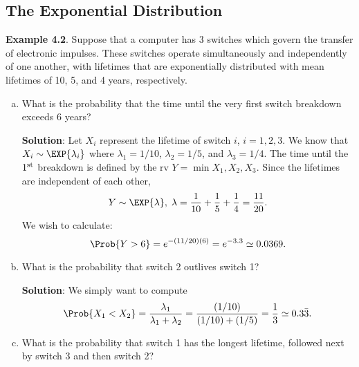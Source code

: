 \subsection*{The Exponential Distribution}
\begin{Example}
    \textbf{Example 4.2}. Suppose that a computer has 3 switches which govern the transfer of electronic
    impulses. These switches operate simultaneously and independently of one another, with
    lifetimes that are exponentially distributed with mean lifetimes of 10, 5, and 4 years,
    respectively.
    \begin{enumerate}[(a)]
        \item What is the probability that the time until the very first switch breakdown exceeds 6
              years?

              \textbf{Solution}: Let $ X_i $ represent the lifetime of switch $ i $, $ i=1,2,3 $.
              We know that $ X_i \sim \EXP{\lambda_i} $ where $ \lambda_1=1/10 $, $ \lambda_2=1/5 $,
              and $ \lambda_3=1/4 $. The time until the $ 1\textsuperscript{st} $ breakdown is defined by
              the rv $ Y=\min{X_1,X_2,X_3} $. Since the lifetimes are independent of each other,
              \[ Y \sim \EXP{\lambda},\; \lambda=\frac{1}{10}+\frac{1}{5}+\frac{1}{4}=\frac{11}{20}. \]
              We wish to calculate:
              \[ \Prob{Y>6}=e^{-(11/20)(6)}=e^{-3.3}\simeq 0.0369. \]
        \item What is the probability that switch 2 outlives switch 1?

              \textbf{Solution}: We simply want to compute
              \[ \Prob{X_1<X_2}=\frac{\lambda_1}{\lambda_1+\lambda_2}=\frac{(1/10)}{(1/10)+(1/5)}=\frac{1}{3}\simeq 0.3\bar{3}. \]
        \item What is the probability that switch 1 has the longest lifetime, followed next by switch 3
              and then switch 2?


\end{enumerate}
\end{Example}
